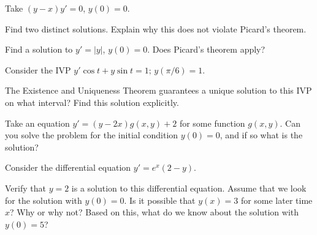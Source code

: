 \documentclass{ximera}
\begin{document}
\begin{exercise}%
    Take $(y-x)y' = 0$, $y(0) = 0$.
    \begin{tasks}
        \task Find two distinct solutions.
        \task Explain why this does not violate Picard's theorem.  
    \end{tasks}
\end{exercise}

\begin{exercise}
    Find a solution to $y' = \lvert y \rvert$, $y(0) = 0$.  Does Picard's theorem apply?
\end{exercise}

\begin{exercise}
    Consider the IVP $y'\cos t+y\sin t=1; \, y(\pi/6)=1$.%
    \begin{tasks}
        \task The Existence and Uniqueness Theorem guarantees a unique solution to this IVP on what interval?
        \task Find this solution explicitly.
    \end{tasks}
\end{exercise}

\begin{exercise}
    Take an equation $y' = (y-2x) g(x,y) + 2$ for some function $g(x,y)$. Can you solve the problem for the initial condition $y(0) = 0$, and if so what is the solution?
\end{exercise}

\begin{exercise}
    Consider the differential equation $y' = e^x(2-y)$.
    \begin{tasks}
        \task Verify that $y = 2$ is a solution to this differential equation.
        \task Assume that we look for the solution with $y(0) = 0$. Is it possible that $y(x) = 3$ for some later time $x$? Why or why not?
        \task Based on this, what do we know about the solution with $y(0) = 5$?
    \end{tasks}
\end{exercise}
\end{document}
